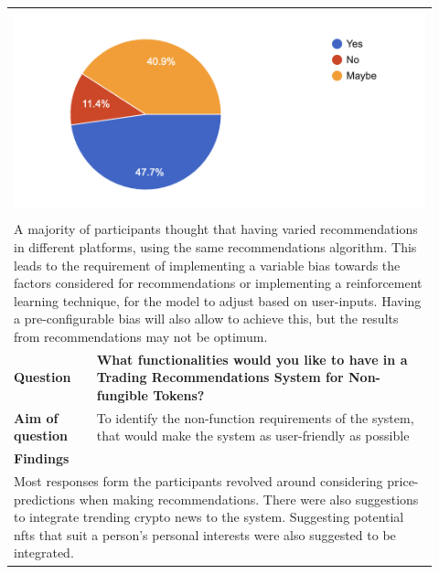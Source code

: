 \begin{longtable}{|p{0.18\linewidth}|p{0.74\linewidth}|}
\multicolumn{2}{|l|}{
\centering
\includegraphics[height=2.3in]{images/SRS/survey/survey-6.png}
} \\ 
\multicolumn{2}{|l|}{
\parbox{\textwidth}{
A majority of participants thought that having varied recommendations in different platforms, using the same recommendations algorithm. This leads to the requirement of implementing a variable bias towards the factors considered for recommendations or implementing a reinforcement learning technique, for the model to adjust based on user-inputs. Having a pre-configurable bias will also allow to achieve this, but the results from recommendations may not be optimum.
}} \\
\hline
\textbf{Question} & \textbf{What functionalities would you like to have in a Trading Recommendations System for Non-fungible Tokens?} \\
\hline
\textbf{Aim of question} & To identify the non-function requirements of the system, that would make the system as user-friendly as possible \\
\hline
\multicolumn{2}{|l|}{\textbf{Findings}} \\

\multicolumn{2}{|l|}{
\parbox{\textwidth}{
Most responses form the participants revolved around considering price-predictions when making recommendations. There were also suggestions to integrate trending crypto news to the system. Suggesting potential \gls{nft}s that suit a person's personal interests were also suggested to be integrated.
}} \\ 
\hline
\end{longtable}


